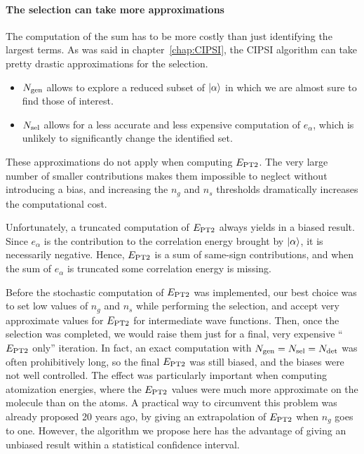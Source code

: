 \documentclass[./thesis.tex]{subfiles}
\begin{document}
\paragraph{The selection can take more approximations}
The computation of the sum has to be more costly than just identifying the largest terms. As was said in chapter~\ref{chap:CIPSI}, the CIPSI algorithm can take pretty drastic approximations for the selection.\cite{Evangelisti_1983}
	\begin{itemize}
		\item{${N_\text{gen}}$}
		allows to explore a reduced subset of $\ket \alpha$ in which we are almost sure to find those of interest.
		\item{${N_\text{sel}}$}
		allows for a less accurate and less expensive computation of $e_\alpha$, which is unlikely to significantly change the identified set.
	\end{itemize}
	These approximations do not apply when computing $E_\text{PT2}$. The very large number of smaller contributions makes them impossible to neglect without introducing a bias, and increasing the $n_g$ and $n_s$ thresholds dramatically increases the computational cost.


Unfortunately, a truncated computation of $E_\text{PT2}$ always yields in a biased result. Since $e_\alpha$ is the contribution to the correlation energy brought by ${\ket{\alpha}}$, it is necessarily negative. Hence, $E_\text{PT2}$ is a sum of same-sign contributions, and when the sum of $e_\alpha$ is truncated some correlation energy is missing.

Before the stochastic computation of $E_\text{PT2}$ was implemented, our best choice was to set low values of $n_g$ and $n_s$ while performing the selection, and accept very approximate values for $E_\text{PT2}$ for intermediate wave functions. Then, once the selection was completed, we would raise them just for a final, very expensive ``$E_\text{PT2}$ only'' iteration. In fact, an exact computation with ${N_\text{gen}}={N_\text{sel}}={N_\text{det}}$ was often prohibitively long, so the final $E_\text{PT2}$ was still biased, and the biases were not well controlled. The effect was particularly important when computing atomization energies, where the $E_\text{PT2}$ values were much more approximate on the molecule than on the atoms.
A practical way to circumvent this problem was already proposed 20 years ago, by giving an extrapolation of $E_\text{PT2}$ when $n_g$ goes to one.\cite{Angeli_1997} However, the algorithm we propose here has the advantage of giving an unbiased result within a statistical confidence interval.
\end{document}
